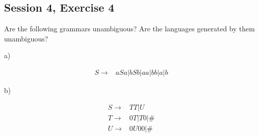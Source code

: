 \subsection{Session 4, Exercise 4}


Are the following grammars unambiguous? Are the languages generated by them unambiguous?

a)

\begin{align*}
S \rightarrow& aSa|bSb|aa|bb|a|b
\end{align*}

b)

\begin{align*}
S \rightarrow& TT|U \\
T \rightarrow& 0T|T0|\# \\
U \rightarrow& 0U00|\#
\end{align*}

